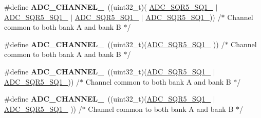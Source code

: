 \begin{DoxyCompactItemize}
\item 
\hypertarget{group___a_d_c__channels_ga66f41aad197a6de160dd8958c90653a2}{\#define {\bfseries A\-D\-C\-\_\-\-C\-H\-A\-N\-N\-E\-L\-\_}~((uint32\-\_\-t)(                 \hyperlink{group___peripheral___registers___bits___definition_ga7aeddef7b3153a014f66e11e72dd0bba}{A\-D\-C\-\_\-\-S\-Q\-R5\-\_\-\-S\-Q1\-\_} $\vert$ \hyperlink{group___peripheral___registers___bits___definition_ga4e21c2a89e71e60406cacb23de6f6597}{A\-D\-C\-\_\-\-S\-Q\-R5\-\_\-\-S\-Q1\-\_} $\vert$ \hyperlink{group___peripheral___registers___bits___definition_ga374490cc8d96ed0a40d3f212bc6fd6d1}{A\-D\-C\-\_\-\-S\-Q\-R5\-\_\-\-S\-Q1\-\_} $\vert$ \hyperlink{group___peripheral___registers___bits___definition_ga6d7b92bf8ba789b76256e205988cc8de}{A\-D\-C\-\_\-\-S\-Q\-R5\-\_\-\-S\-Q1\-\_}))  /$\ast$ Channel common to both bank A and bank B $\ast$/}\label{group___a_d_c__channels_ga66f41aad197a6de160dd8958c90653a2}

\item 
\hypertarget{group___a_d_c__channels_ga7892590f524e7356deb1e513bbc0cdaf}{\#define {\bfseries A\-D\-C\-\_\-\-C\-H\-A\-N\-N\-E\-L\-\_}~((uint32\-\_\-t)(\hyperlink{group___peripheral___registers___bits___definition_ga72e4578aaae278121803054afacaf141}{A\-D\-C\-\_\-\-S\-Q\-R5\-\_\-\-S\-Q1\-\_}                                                                    ))  /$\ast$ Channel common to both bank A and bank B $\ast$/}\label{group___a_d_c__channels_ga7892590f524e7356deb1e513bbc0cdaf}

\item 
\hypertarget{group___a_d_c__channels_gaf7760a480f79c62d19260291f8afb6e1}{\#define {\bfseries A\-D\-C\-\_\-\-C\-H\-A\-N\-N\-E\-L\-\_}~((uint32\-\_\-t)(\hyperlink{group___peripheral___registers___bits___definition_ga72e4578aaae278121803054afacaf141}{A\-D\-C\-\_\-\-S\-Q\-R5\-\_\-\-S\-Q1\-\_}                                                    $\vert$ \hyperlink{group___peripheral___registers___bits___definition_ga6d7b92bf8ba789b76256e205988cc8de}{A\-D\-C\-\_\-\-S\-Q\-R5\-\_\-\-S\-Q1\-\_}))  /$\ast$ Channel common to both bank A and bank B $\ast$/}\label{group___a_d_c__channels_gaf7760a480f79c62d19260291f8afb6e1}

\item 
\hypertarget{group___a_d_c__channels_ga30fc8e77b4c89d3ea0609cfbc7fc90fd}{\#define {\bfseries A\-D\-C\-\_\-\-C\-H\-A\-N\-N\-E\-L\-\_}~((uint32\-\_\-t)(\hyperlink{group___peripheral___registers___bits___definition_ga72e4578aaae278121803054afacaf141}{A\-D\-C\-\_\-\-S\-Q\-R5\-\_\-\-S\-Q1\-\_}                                   $\vert$ \hyperlink{group___peripheral___registers___bits___definition_ga374490cc8d96ed0a40d3f212bc6fd6d1}{A\-D\-C\-\_\-\-S\-Q\-R5\-\_\-\-S\-Q1\-\_}                 ))  /$\ast$ Channel common to both bank A and bank B $\ast$/}\label{group___a_d_c__channels_ga30fc8e77b4c89d3ea0609cfbc7fc90fd}


\end{DoxyCompactItemize}
